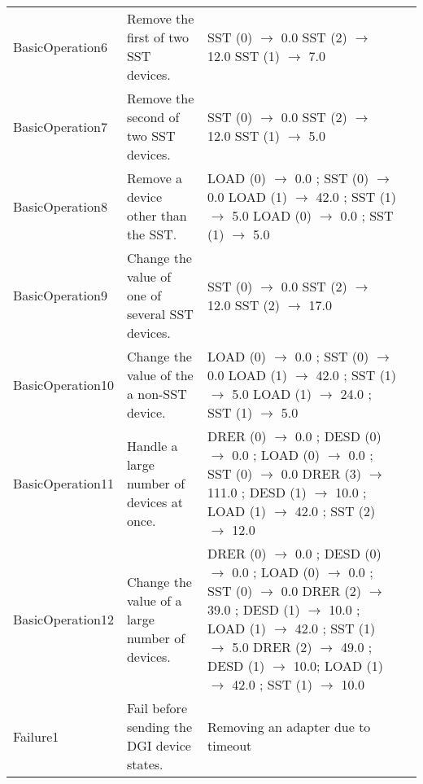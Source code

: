 \documentclass{article}
\begin{document}
\begin{center}
\begin{footnotesize}
\begin{longtable}{|p{3cm}|p{4cm}|p{10cm}|c|}
    BasicOperation6 & Remove the first of two SST devices. & SST (0) $\rightarrow$ 0.0 \newline SST (2) $\rightarrow$ 12.0 \newline SST (1) $\rightarrow$ 7.0 & \\
    BasicOperation7 & Remove the second of two SST devices. & SST (0) $\rightarrow$ 0.0 \newline SST (2) $\rightarrow$ 12.0 \newline SST (1) $\rightarrow$ 5.0 & \\
    BasicOperation8 & Remove a device other than the SST. & LOAD (0) $\rightarrow$ 0.0 ; SST (0) $\rightarrow$ 0.0 \newline LOAD (1) $\rightarrow$ 42.0 ; SST (1) $\rightarrow$ 5.0 \newline LOAD (0) $\rightarrow$ 0.0 ; SST (1) $\rightarrow$ 5.0 & \\
    BasicOperation9 & Change the value of one of several SST devices. & SST (0) $\rightarrow$ 0.0 \newline SST (2) $\rightarrow$ 12.0 \newline SST (2) $\rightarrow$ 17.0 & \\
    BasicOperation10 & Change the value of the a non-SST device. & LOAD (0) $\rightarrow$ 0.0 ; SST (0) $\rightarrow$ 0.0 \newline LOAD (1) $\rightarrow$ 42.0 ; SST (1) $\rightarrow$ 5.0 \newline LOAD (1) $\rightarrow$ 24.0 ; SST (1) $\rightarrow$ 5.0 & \\
    BasicOperation11 & Handle a large number of devices at once. & DRER (0) $\rightarrow$ 0.0 ; DESD (0) $\rightarrow$ 0.0 ; LOAD (0) $\rightarrow$ 0.0 ; SST (0) $\rightarrow$ 0.0 \newline DRER (3) $\rightarrow$ 111.0 ; DESD (1) $\rightarrow$ 10.0 ; LOAD (1) $\rightarrow$ 42.0 ; SST (2) $\rightarrow$ 12.0 & \\
    BasicOperation12 & Change the value of a large number of devices. & DRER (0) $\rightarrow$ 0.0 ; DESD (0) $\rightarrow$ 0.0 ; LOAD (0) $\rightarrow$ 0.0 ; SST (0) $\rightarrow$ 0.0 \newline DRER (2) $\rightarrow$ 39.0 ; DESD (1) $\rightarrow$ 10.0 ; LOAD (1) $\rightarrow$ 42.0 ; SST (1) $\rightarrow$ 5.0 \newline DRER (2) $\rightarrow$ 49.0 ; DESD (1) $\rightarrow$ 10.0; LOAD (1) $\rightarrow$ 42.0 ; SST (1) $\rightarrow$ 10.0 & \\
    Failure1 & Fail before sending the DGI device states. & Removing an adapter due to timeout & \\

\end{longtable}
\end{footnotesize}
\end{center}
\end{document}
